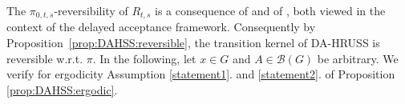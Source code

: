 \documentclass[sn-mathphys-num]{sn-jnl}%
\theoremstyle{thmstyleone}%
\theoremstyle{thmstyletwo}%
\theoremstyle{thmstylethree}%
\newcommand{\change}[1]{\bgroup\color{black}#1\egroup}    %
\begin{document}
\begin{appendices}
\noindent \change{The $\pi_{0,t,s}$-reversibility of $R_{t,s}$ is a consequence of \cite[Lemma~4.10]{Rudolf2012} and of  \cite[Lemma~9]{LatuszynskiRudolf2024}, both viewed in the context of the delayed acceptance framework. Consequently by Proposition~\ref{prop:DAHSS:reversible}, the transition kernel of DA-HRUSS is reversible w.r.t. $\pi$.}  
In the following, let $x\in G$ and $A\in\mathcal{B}(G)$ be arbitrary. We \change{verify} for ergodicity Assumption \ref{statement1}. and \ref{statement2}. of Proposition \ref{prop:DAHSS:ergodic}. 
\begin{enumerate}


\end{enumerate}
\end{appendices}
\end{document}

